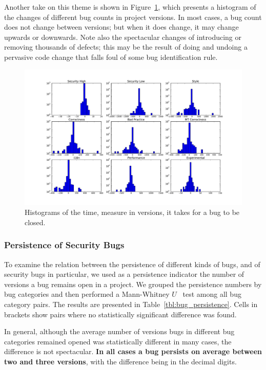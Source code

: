 \documentclass[conference]{llncs}
\begin{document}
Another take on this theme is shown in Figure~\ref{fig:bugdiffs},
which presents a histogram of the changes of different bug counts in
project versions. In most cases, a bug count does not change between
versions; but when it does change, it may change upwards or downwards.
Note also the spectacular changes of introducing or removing thousands
of defects; this may be the result of doing and undoing a pervasive
code change that falls foul of some bug identification rule.

\begin{figure}[t]
  \centering
  \includegraphics[scale=0.4]{bugdiffs}
  \caption{Histograms of the time, measure in versions, it takes for a
    bug to be closed. }
  \label{fig:bugdiffs}
\end{figure}


\subsubsection{Persistence of Security Bugs}

To examine the relation between the persistence of different kinds of
bugs, and of security bugs in particular, we used as a persistence
indicator the number of versions a bug remains open in a project. We
grouped the persistence numbers by bug categories and then performed a
Mann-Whitney $U$~\cite{HM98} test among all bug category pairs. The results are
presented in Table~\ref{tbl:bug_persistence}. Cells in brackets show
pairs where no statistically significant difference was found.

In general, although the average number of versions bugs in different
bug categories remained opened was statistically different in many
cases, the difference is not spectacular. \textbf{In all cases a bug persists
on average between two and three versions}, with the difference being
in the decimal digits.
\end{document}
